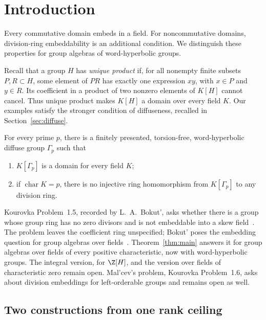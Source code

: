 \section{Introduction}

Every commutative domain embeds in a field. For noncommutative domains,
division-ring embeddability is an additional condition. We distinguish
these properties for group algebras of word-hyperbolic groups.

Recall that a group \(H\) has \emph{unique product} if, for all nonempty
finite subsets \(P,R\subset H\), some element of \(PR\) has exactly one
expression \(xy\), with \(x\in P\) and \(y\in R\). Its coefficient in a
product of two nonzero elements of \(K[H]\) cannot cancel. Thus unique
product makes \(K[H]\) a domain over every field \(K\). Our examples
satisfy the stronger condition of diffuseness, recalled in
Section~\ref{sec:diffuse}.

\begin{maintheorem}\label{thm:main}
For every prime \(p\), there is a finitely presented, torsion-free,
word-hyperbolic diffuse group \(\Gamma_p\) such that
\begin{enumerate}
\item \(K[\Gamma_p]\) is a domain for every field \(K\);
\item if \(\operatorname{char}K=p\), there is no injective ring
homomorphism from \(K[\Gamma_p]\) to any division ring.
\end{enumerate}
\end{maintheorem}

Kourovka Problem~1.5, recorded by L.~A.~Bokut', asks whether there is a
group whose group ring has no zero divisors and is not embeddable into
a skew field~\cite{Kourovka}. The problem leaves the coefficient ring
unspecified; Bokut' poses the embedding question for group algebras over
fields~\cite[p.~122]{Bokut87}. Theorem~\ref{thm:main} answers it for
group algebras over fields of every positive characteristic, now with
word-hyperbolic groups. The integral version, for \(\Z[H]\), and the
version over fields of characteristic zero remain open. Mal'cev's
problem, Kourovka Problem~1.6, asks about division embeddings for
left-orderable groups and remains open as well.

\subsection*{Two constructions from one rank ceiling}


